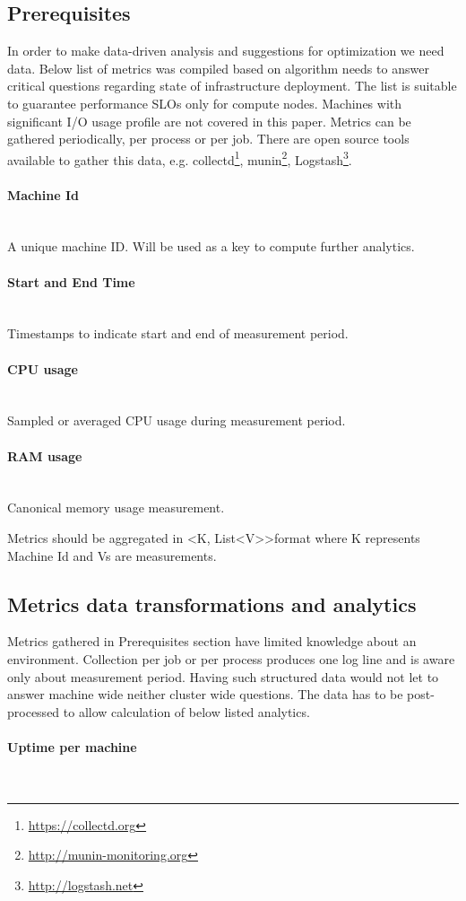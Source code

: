 \documentclass[]{final_report}
\newcommand{\myparagraph}[1]{\paragraph{#1}\mbox{}\\}
\begin{document}
\subsection{Prerequisites} 

In order to make data-driven analysis and suggestions for optimization we need data. Below list of metrics was compiled based on algorithm needs to answer critical questions regarding state of infrastructure deployment. The list is suitable to guarantee performance SLOs only for compute nodes. Machines with significant I/O usage profile are not covered in this paper. 
Metrics can be gathered periodically, per process or per job. There are open source tools available to gather this data, e.g. collectd\footnote{\url{https://collectd.org}}, munin\footnote{\url{http://munin-monitoring.org}}, Logstash\footnote{\url{http://logstash.net}}.

\myparagraph{Machine Id}
A unique machine ID. Will be used as a key to compute further analytics.

\myparagraph{Start and End Time}
Timestamps to indicate start and end of measurement period.

\myparagraph{CPU usage}
Sampled or averaged CPU usage during measurement period. 

\myparagraph{RAM usage}
Canonical memory usage measurement. 

Metrics should be aggregated in \textless K, List\textless V\textgreater\textgreater format where K represents Machine Id and Vs are measurements. 

\subsection{Metrics data transformations and analytics}

Metrics gathered in Prerequisites section have limited knowledge about an environment. Collection per job or per process produces one log line and is aware only about measurement period. Having such structured data would not let to answer machine wide neither cluster wide questions. The data has to be post-processed to allow calculation of below listed analytics.   



\myparagraph{Uptime per machine}

\begin{algorithm}[H]
\end{algorithm}
\end{document}
